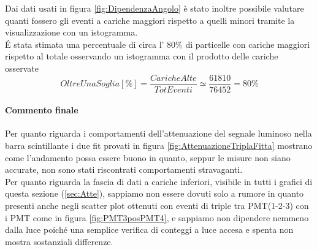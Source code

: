 \documentclass[a4paper]{article}
\begin{document}
Dai dati usati in figura \ref{fig:DipendenzaAngolo} è stato inoltre possibile valutare quanti fossero gli eventi a cariche maggiori rispetto a quelli minori tramite la visualizzazione con un istogramma.\\
\'E stata stimata una percentuale di circa l' 80$\%$ di particelle con cariche maggiori rispetto al totale osservando un istogramma con il prodotto delle cariche osservate
\begin{equation}
OltreUnaSoglia [\%] = \frac{Cariche Alte}{Tot Eventi} \simeq \frac{61810}{76452} = 80 \% 
\end{equation}

\paragraph{Commento finale}
Per quanto riguarda i comportamenti dell'attenuazione del segnale luminoso nella barra scintillante i due fit provati in figura \ref{fig:AttenuazioneTriplaFitta} mostrano come l'andamento possa essere buono in quanto, seppur le misure non siano accurate, non sono stati riscontrati comportamenti stravaganti.\\
Per quanto riguarda la fascia di dati a cariche inferiori, visibile in tutti i grafici di questa sezione (\ref{sec:Atte}), sappiamo non essere dovuti solo a rumore in quanto presenti anche negli scatter plot ottenuti con eventi di triple tra PMT(1-2-3) con i PMT come in figura \ref{fig:PMT3posPMT4}, e sappiamo non dipendere nemmeno dalla luce poiché una semplice verifica di conteggi a luce accesa e spenta non mostra sostanziali differenze.

\newpage
\end{document}
